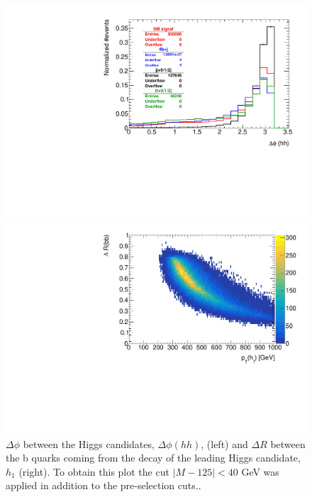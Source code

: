\begin{figure}
	\centering
	\begin{minipage}{.5\textwidth}
		\centering
		\includegraphics[width=\linewidth]{./Figures/hist_hh_deltaPhi.pdf}
	\end{minipage}%
	\begin{minipage}{.5\textwidth}
		\centering
		\includegraphics[width=\linewidth]{./Figures/hist_deltaR_bb_pt.pdf}
	\end{minipage}
	\label{fig:deltaPhi_deltaR}
	\caption{$\Delta\phi$ between the Higgs candidates, $\Delta\phi(hh)$, (left) and $\Delta R$ between the b quarks coming from the decay of the leading Higgs candidate, $h_1$ (right). To obtain this plot the cut $|M-125|<40$ GeV was applied in addition to the pre-selection cuts..}
\end{figure}

